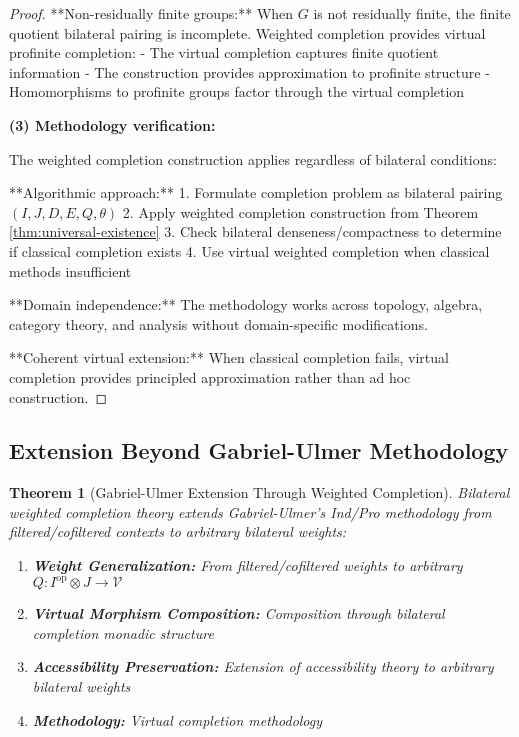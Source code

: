 \documentclass[11pt]{article}
\theoremstyle{plain}
\newtheorem{theorem}{Theorem}[section]
\theoremstyle{definition}
\theoremstyle{remark}
\newcommand{\V}{\mathcal{V}}
\newcommand{\op}{\mathrm{op}}
\begin{document}
\begin{proof}
**Non-residually finite groups:** When $G$ is not residually finite, the finite quotient bilateral pairing is incomplete. Weighted completion provides virtual profinite completion:
- The virtual completion captures finite quotient information  
- The construction provides approximation to profinite structure
- Homomorphisms to profinite groups factor through the virtual completion

\textbf{(3) Methodology verification:}

The weighted completion construction applies regardless of bilateral conditions:

**Algorithmic approach:**
1. Formulate completion problem as bilateral pairing $(I, J, D, E, Q, \theta)$
2. Apply weighted completion construction from Theorem \ref{thm:universal-existence}
3. Check bilateral denseness/compactness to determine if classical completion exists
4. Use virtual weighted completion when classical methods insufficient

**Domain independence:** The methodology works across topology, algebra, category theory, and analysis without domain-specific modifications.

**Coherent virtual extension:** When classical completion fails, virtual completion provides principled approximation rather than ad hoc construction.
\end{proof}

\subsection{Extension Beyond Gabriel-Ulmer Methodology}

\begin{theorem}[Gabriel-Ulmer Extension Through Weighted Completion]\label{thm:gabriel-ulmer-extension}
Bilateral weighted completion theory extends Gabriel-Ulmer's Ind/Pro methodology from filtered/cofiltered contexts to arbitrary bilateral weights:

\begin{enumerate}
\item \textbf{Weight Generalization:} From filtered/cofiltered weights to arbitrary $Q : I^{\op} \otimes J \to \V$

\item \textbf{Virtual Morphism Composition:} Composition through bilateral completion monadic structure

\item \textbf{Accessibility Preservation:} Extension of accessibility theory to arbitrary bilateral weights

\item \textbf{Methodology:} Virtual completion methodology
\end{enumerate}
\end{theorem}
\end{document}
